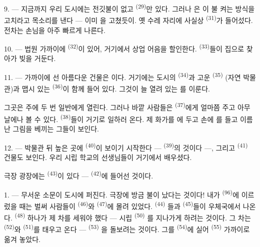 9. --- 지금까지 우리 도시에는 전깃불이 없고  \textsuperscript{(29)}만
있다. 그러나 은 이 불 켜는 방식을 고치라고 목소리를 낸다 — 이미
을 고쳤듯이.  옛 수레 자리에 사실상
 \textsuperscript{(31)}가 들어섰다. 전차는 손님을  아주  빠르게 나른다.

10. --- 법원 가까이에  \textsuperscript{(32)}이 있어, 거기에서 상업 어음을
할인한다.  \textsuperscript{(33)}들이 집으로 찾아가 빚을 거둔다.

\VUsaut{5.0mm}
\VUsaut{3.4mm}

11. --- 가까이에 선 아름다운 건물은 이다. 거기에는 도시의
 \textsuperscript{(34)}과 고운  \textsuperscript{(35)}
(자연 박물관)과 맵시 있는  \textsuperscript{(36)}이 함께 들어 있다.
그것이 늘 열려 있는 를 이룬다.

그곳은 주에 두 번 일반에게 열린다. 그러나 바깥 사람들은 
\textsuperscript{(37)}에게 얼마쯤 주고 아무 날에나 볼 수 있다. 
\textsuperscript{(38)}들이 거기로 일하러 온다. 제 화가를 에 두고 손에
를 들고 이름난 그림을 베끼는 그들이 보인다.

12. --- 박물관 뒤 높은 곳에  \textsuperscript{(40)}이 보이기 시작한다
—  \textsuperscript{(39)}의 것이다 —, 그리고 
\textsuperscript{(41)} 건물도 보인다. 우리 시립 학교의 선생님들이 거기에서 배우셨다.

극장 광장에는  \textsuperscript{(43)}이 있다 — 
\textsuperscript{(42)}에 들어선 것이다.

\VUsaut{6.0mm}
\VUsaut{3.0mm}

\VUsaut{3.4mm}

1. --- 무서운 소문이 도시에 퍼진다. 극장에 방금 불이 났다는 것이다! 내가 
\textsuperscript{(96)}에 이르렀을 때는 벌써 사람들이  \textsuperscript{(46)}와
 \textsuperscript{(47)}에 몰려 있었다.  \textsuperscript{(44)}
들과  \textsuperscript{(45)}들이 우체국에서 나온다. 
\textsuperscript{(48)} 하나가 제 차를 세워야 했다 — 시립  \textsuperscript{(50)}
를 지나가게 하려는 것이다. 그 차는  \textsuperscript{(52)}와
 \textsuperscript{(51)}를 태우고 온다 —  \textsuperscript{(53)}
을 돌보려는 것이다. 그를  \textsuperscript{(54)}에 실어 
\textsuperscript{(55)} 가까이로 옮겨 놓았다.

